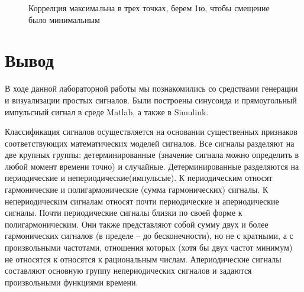 \documentclass[12pt,a4paper]{scrartcl}
\begin{document}
\begin{figure}[h!]
\caption{Коррелция максимальна в трех точках, берем 1ю, чтобы смещение было минимальным}
\end{figure}

\section{Вывод}
\label{sec:afterWork}
В ходе данной лабораторной работы мы познакомились со средствами генерации и визуализации простых сигналов. Были построены синусоида и прямоугольный импульсный сигнал в среде Matlab, а также в Simulink.

Классификация сигналов осуществляется на основании существенных признаков соответствующих математических моделей сигналов. Все сигналы разделяют на две крупных группы: детерминированные (значение сигнала можно определить в любой момент времени точно) и случайные. Детерминированные разделяются на периодические и непериодические(импульсые). К периодическим относят гармонические и полигармонические (сумма гармонических) сигналы. К непериодическим сигналам относят почти периодические и апериодические сигналы. Почти периодические сигналы близки по своей форме к полигармоническим. Они также представляют собой сумму двух и более гармонических сигналов (в пределе – до бесконечности), но не с кратными, а с произвольными частотами, отношения которых (хотя бы двух частот минимум) не относятся к относятся к рациональным числам. Апериодические сигналы составляют основную группу непериодических сигналов и задаются произвольными функциями времени.\\
\\
\end{document}
